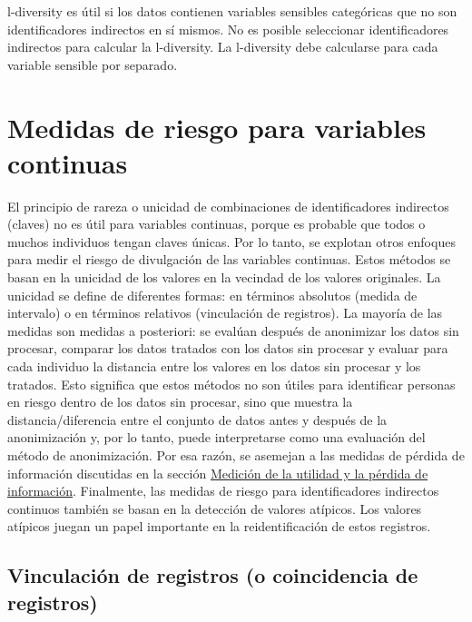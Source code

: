\documentclass[]{book}
\theoremstyle{definition}
\theoremstyle{definition}
\theoremstyle{definition}
\theoremstyle{definition}
\theoremstyle{remark}
\begin{document}
l-diversity es útil si los datos contienen variables sensibles categóricas que no son identificadores indirectos en sí mismos. No es posible seleccionar identificadores indirectos para calcular la l-diversity. La l-diversity debe calcularse para cada variable sensible por separado.

\hypertarget{medidas-de-riesgo-para-variables-continuas}{%
\section{Medidas de riesgo para variables continuas}\label{medidas-de-riesgo-para-variables-continuas}}

El principio de rareza o unicidad de combinaciones de identificadores indirectos (claves) no es útil para variables continuas, porque es probable que todos o muchos individuos tengan claves únicas. Por lo tanto, se explotan otros enfoques para medir el riesgo de divulgación de las variables continuas. Estos métodos se basan en la unicidad de los valores en la vecindad de los valores originales. La unicidad se define de diferentes formas: en términos absolutos (medida de intervalo) o en términos relativos (vinculación de registros). La mayoría de las medidas son medidas a posteriori: se evalúan después de anonimizar los datos sin procesar, comparar los datos tratados con los datos sin procesar y evaluar para cada individuo la distancia entre los valores en los datos sin procesar y los tratados. Esto significa que estos métodos no son útiles para identificar personas en riesgo dentro de los datos sin procesar, sino que muestra la distancia/diferencia entre el conjunto de datos antes y después de la anonimización y, por lo tanto, puede interpretarse como una evaluación del método de anonimización. Por esa razón, se asemejan a las medidas de pérdida de información discutidas en la sección \protect\hyperlink{mediciuxf3n-de-la-utilidad-y-la-puxe9rdida-de-informaciuxf3n}{Medición de la utilidad y la pérdida de información}. Finalmente, las medidas de riesgo para identificadores indirectos continuos también se basan en la detección de valores atípicos. Los valores atípicos juegan un papel importante en la reidentificación de estos registros.

\hypertarget{vinculaciuxf3n-de-registros-o-coincidencia-de-registros}{%
\subsection{Vinculación de registros (o coincidencia de registros)}\label{vinculaciuxf3n-de-registros-o-coincidencia-de-registros}}
\end{document}
